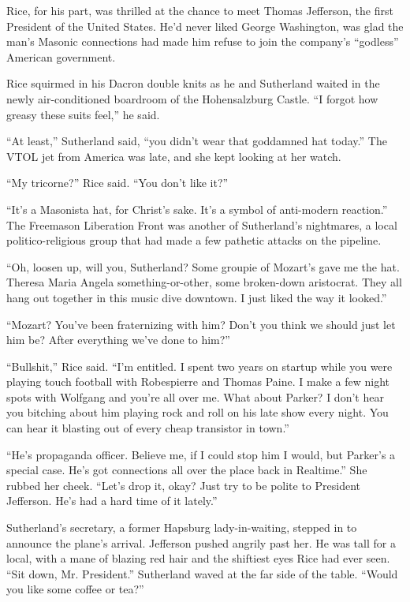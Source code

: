 Rice, for his part, was thrilled at the chance to meet Thomas Jefferson, the first President of the United States. He’d never liked George Washington, was glad the man’s Masonic connections had made him refuse to join the company’s “godless” American government.

Rice squirmed in his Dacron double knits as he and Sutherland waited in the newly air-conditioned boardroom of the Hohensalzburg Castle. “I forgot how greasy these suits feel,” he said.

“At least,” Sutherland said, “you didn’t wear that goddamned hat today.” The VTOL jet from America was late, and she kept looking at her watch.

“My tricorne?” Rice said. “You don’t like it?”

“It’s a Masonista hat, for Christ’s sake. It’s a symbol of anti-modern reaction.” The Freemason Liberation Front was another of Sutherland’s nightmares, a local politico-religious group that had made a few pathetic attacks on the pipeline.

“Oh, loosen up, will you, Sutherland? Some groupie of Mozart’s gave me the hat. Theresa Maria Angela something-or-other, some broken-down aristocrat. They all hang out together in this music dive downtown. I just liked the way it looked.”

“Mozart? You’ve been fraternizing with him? Don’t you think we should just let him be? After everything we’ve done to him?”

“Bullshit,” Rice said. “I’m entitled. I spent two years on startup while you were playing touch football with Robespierre and Thomas Paine. I make a few night spots with Wolfgang and you’re all over me. What about Parker? I don’t hear you bitching about him playing rock and roll on his late show every night. You can hear it blasting out of every cheap transistor in town.”

“He’s propaganda officer. Believe me, if I could stop him I would, but Parker’s a special case. He’s got connections all over the place back in Realtime.” She rubbed her cheek. “Let’s drop it, okay? Just try to be polite to President Jefferson. He’s had a hard time of it lately.”

Sutherland’s secretary, a former Hapsburg lady-in-waiting, stepped in to announce the plane’s arrival. Jefferson pushed angrily past her. He was tall for a local, with a mane of blazing red hair and the shiftiest eyes Rice had ever seen. “Sit down, Mr. President.” Sutherland waved at the far side of the table. “Would you like some coffee or tea?”

